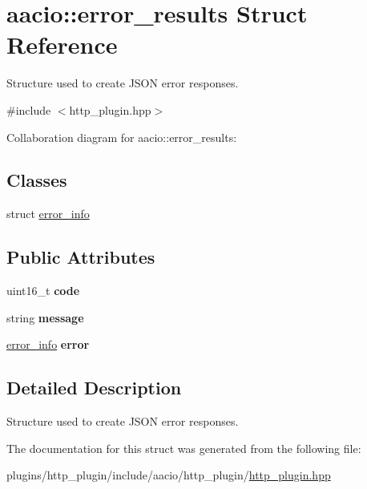 \hypertarget{structaacio_1_1error__results}{}\section{aacio\+:\+:error\+\_\+results Struct Reference}
\label{structaacio_1_1error__results}


Structure used to create J\+S\+ON error responses.  




{\ttfamily \#include $<$http\+\_\+plugin.\+hpp$>$}



Collaboration diagram for aacio\+:\+:error\+\_\+results\+:
\subsection*{Classes}
\begin{DoxyCompactItemize}
\item 
struct \mbox{\hyperlink{structaacio_1_1error__results_1_1error__info}{error\+\_\+info}}
\end{DoxyCompactItemize}
\subsection*{Public Attributes}
\begin{DoxyCompactItemize}
\item 
\mbox{\label{structaacio_1_1error__results_a054de8c6214109bc9479b811a0f84fff}} 
uint16\+\_\+t {\bfseries code}
\item 
\mbox{\label{structaacio_1_1error__results_a841b51557c74a4c4ce6f69f6bcd5cfd3}} 
string {\bfseries message}
\item 
\mbox{\label{structaacio_1_1error__results_a03343143f5604aa75f4b8d05efc91b29}} 
\mbox{\hyperlink{structaacio_1_1error__results_1_1error__info}{error\+\_\+info}} {\bfseries error}
\end{DoxyCompactItemize}


\subsection{Detailed Description}
Structure used to create J\+S\+ON error responses. 

The documentation for this struct was generated from the following file\+:\begin{DoxyCompactItemize}
\item 
plugins/http\+\_\+plugin/include/aacio/http\+\_\+plugin/\mbox{\hyperlink{http__plugin_8hpp}{http\+\_\+plugin.\+hpp}}\end{DoxyCompactItemize}
